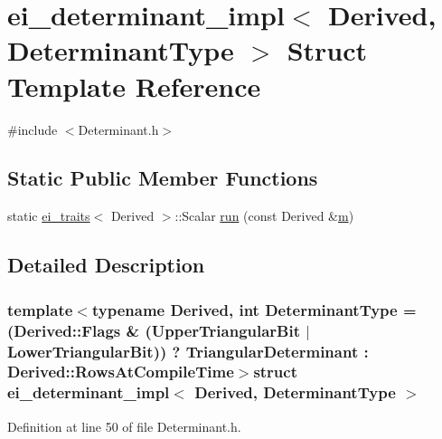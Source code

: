 \hypertarget{structei__determinant__impl}{\section{ei\-\_\-determinant\-\_\-impl$<$ Derived, Determinant\-Type $>$ Struct Template Reference}
\label{structei__determinant__impl}
}


{\ttfamily \#include $<$Determinant.\-h$>$}

\subsection*{Static Public Member Functions}
\begin{DoxyCompactItemize}
\item 
static \hyperlink{structei__traits}{ei\-\_\-traits}$<$ Derived $>$\-::Scalar \hyperlink{structei__determinant__impl_a8020d67d06f201a8ec53e35d8df1f224}{run} (const Derived \&\hyperlink{glext_8h_af593500c283bf1a787a6f947f503a5c2}{m})
\end{DoxyCompactItemize}


\subsection{Detailed Description}
\subsubsection*{template$<$typename Derived, int Determinant\-Type = (\-Derived\-::\-Flags \& (\-Upper\-Triangular\-Bit $|$ Lower\-Triangular\-Bit)) ? Triangular\-Determinant \-: Derived\-::\-Rows\-At\-Compile\-Time$>$struct ei\-\_\-determinant\-\_\-impl$<$ Derived, Determinant\-Type $>$}



Definition at line 50 of file Determinant.\-h.



